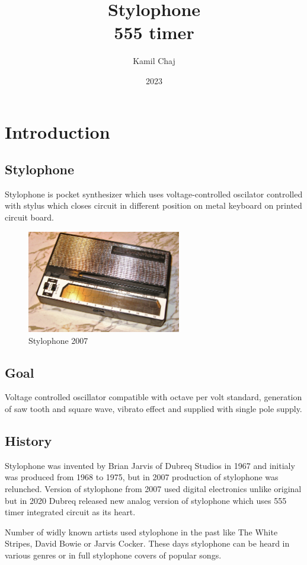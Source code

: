 \documentclass[english,10pt,a4paper]{article}
\title{Stylophone\\
	\normalsize 555 timer}
\author{Kamil Chaj}
\date{2023}
\begin{document}
	\maketitle
	\tableofcontents
	\newpage
	
	\section{Introduction}
	
	\subsection{Stylophone}
	Stylophone is pocket synthesizer which uses voltage-controlled oscilator controlled with stylus which closes circuit in different position on metal keyboard on printed circuit board.
	\begin{figure}[H]
		\centering
		\includegraphics[width=0.6\textwidth]{img/Modern_Stylophone.jpg}
		\caption{Stylophone 2007}
	\end{figure}
	
	\subsection{Goal}
	Voltage controlled oscillator compatible with octave per volt standard, generation of saw tooth and square wave, vibrato effect and supplied with single pole supply.	
	
	\subsection{History}
	Stylophone was invented by Brian Jarvis of Dubreq Studios in 1967 and initialy was produced from 1968 to 1975, but in 2007 production of stylophone was relunched. Version of stylophone from 2007 used digital electronics unlike original but in 2020 Dubreq released new analog version of stylophone which uses 555 timer integrated circuit as its heart.
	
	Number of widly known artists used stylophone in the past like The White Stripes, David Bowie or Jarvis Cocker. These days stylophone can be heard in various genres or in full stylophone covers of popular songs.
	
\end{document}
